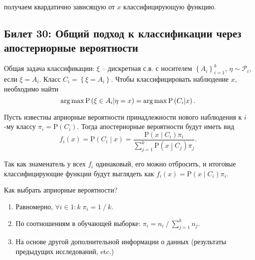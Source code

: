 		получаем квардатично зависящую от $x$ классифицирующую функцию.

	

\subsection{Билет 30: Общий подход к классификации через апостериорные вероятности} %
	Общая задача классификации: $\xi$ -- дискретная с.в. с носителем $\left\lbrace A_i\right\rbrace_{i=1}^k$, $\eta \sim \mathcal P_i$, если $\xi = A_i$. Класс $C_i = \left\lbrace\xi = A_i\right\rbrace$.  Чтобы классифицировать наблюдение $x$, необходимо найти 
	$$\operatorname*{arg\,max}\mathrm P\left(\xi\in A_i\middle\vert \eta = x\right) = \operatorname*{arg\,max}\mathrm P\left(C_i\middle\vert x\right).$$

	Пусть известны априорные вероятности принадлежности нового наблюдения к $i$-му классу $\pi_i = \mathrm P\left(C_i\right)$. Тогда апостериорные вероятности будут иметь вид $$f_i\left(x\right) = \mathrm P\left(C_i\middle\vert x\right) = \frac{\mathrm P\left(x\middle\vert C_i\right) \pi_i}{\sum_{j=1}^k \mathrm P\left(x\middle\vert C_j\right) \pi_j}. $$

	Так как знаменатель у всех $f_i$ одинаковый, его можно отбросить, и итоговые классифицирующие функции будут выглядеть как $f_i\left(x\right) = \mathrm P\left(x\middle\vert C_i\right) \pi_i$.

	Как выбрать априорные вероятности?

	\begin{enumerate}
		\item Равномерно, $\forall i \in 1\mathbin : k \; \pi_i = 1 \mathbin / k$.
		\item По соотношениям в обучающей выборке: $\pi_i = n_i \mathbin / \sum_{j=1}^k n_j$.
		\item На основе другой дополнительной информации о данных (результаты предыдущих исследований, etc.)
	\end{enumerate}


	